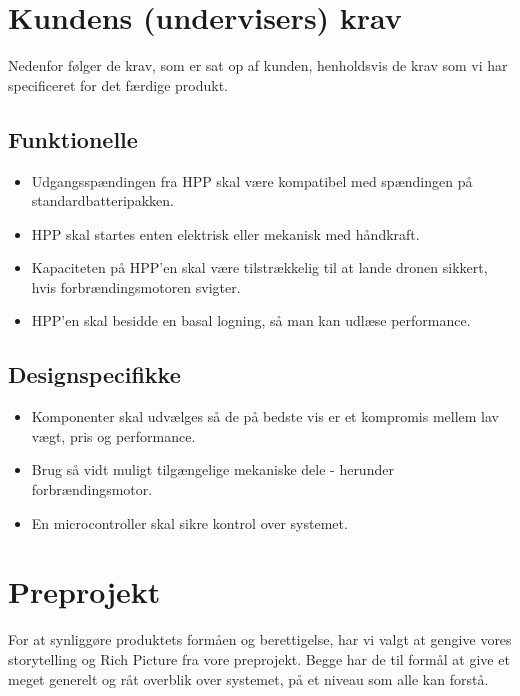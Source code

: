 \section{Kundens (undervisers) krav}
\label{sec:kravsspecifikation-1}
Nedenfor følger de krav, som er sat op af kunden, henholdsvis de krav som vi har specificeret for det færdige produkt.


\subsection{Funktionelle}
\label{sec:funktionelle}

\begin{itemize}
\item Udgangsspændingen fra HPP skal være kompatibel med spændingen på standardbatteripakken.
\item HPP skal startes enten elektrisk eller mekanisk med håndkraft.
\item Kapaciteten på HPP’en skal være tilstrækkelig til at lande dronen sikkert, hvis forbrændingsmotoren svigter.
\item HPP’en skal besidde en basal logning, så man kan udlæse performance.
\end{itemize}

\subsection{Designspecifikke }
\label{sec:designspecifikke-}

\begin{itemize}
\item Komponenter skal udvælges så de på bedste vis er et kompromis mellem lav vægt, pris og performance.
\item Brug så vidt muligt tilgængelige mekaniske dele - herunder forbrændingsmotor. 
\item En microcontroller skal sikre kontrol over systemet.
\end{itemize}

\section{Preprojekt}
\label{sec:preprojekt-}

For at synliggøre produktets formåen og berettigelse, har vi valgt at gengive vores storytelling og Rich Picture fra vore preprojekt. Begge har de til formål at give et meget generelt og råt overblik over systemet, på et niveau som alle kan forstå.

